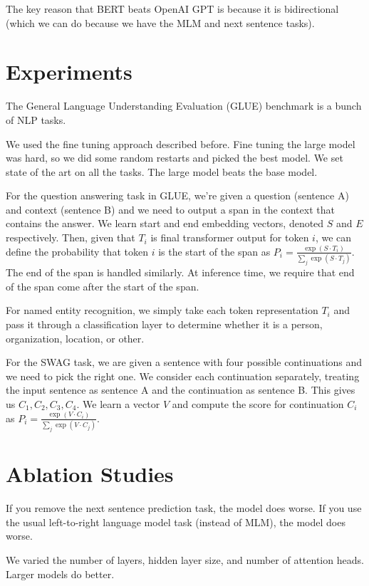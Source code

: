 \documentclass[a4paper]{article}
\begin{document}
The key reason that BERT beats OpenAI GPT is because it is bidirectional
(which we can do because we have the MLM and next sentence tasks).


\section{Experiments}
The  General Language Understanding Evaluation (GLUE) benchmark is a bunch of
NLP tasks.

We used the fine tuning approach described before. Fine tuning the large model
was hard, so we did some random restarts and picked the best model. We set
state of the art on all the tasks. The large model beats the base model.

For the question answering task in GLUE, we're given a question (sentence A)
and context (sentence B) and we need to output a span in the context that
contains the answer. We learn start and end embedding vectors, denoted $S$
and $E$ respectively. Then, given that $T_i$ is final transformer output for
token $i$, we can define the probability that token $i$ is the start of
the span as $P_i = \frac{\exp(S \cdot T_i)}{\sum_{j}{\exp(S \cdot T_j)}}$.
The end of the span is handled similarly. At inference time, we require that
end of the span come after the start of the span.

For named entity recognition, we simply take each token representation
$T_i$ and pass it through a classification layer to determine whether it is
a person, organization, location, or other.

For the SWAG task, we are given a sentence with four possible continuations and
we need to pick the right one. We consider each continuation separately,
treating the input sentence as sentence A and the continuation as sentence B.
This gives us $C_1, C_2, C_3, C_4$. We learn a vector $V$ and compute the
score for continuation $C_i$ as $P_i = \frac{\exp{(V \cdot C_i)}}{\sum_{j}{
\exp{(V \cdot C_j)}}}$.

\section{Ablation Studies}
If you remove the next sentence prediction task, the model does worse. If you
use the usual left-to-right language model task (instead of MLM), the model does
worse.

We varied the number of layers, hidden layer size, and number of attention
heads. Larger models do better.
\end{document}
